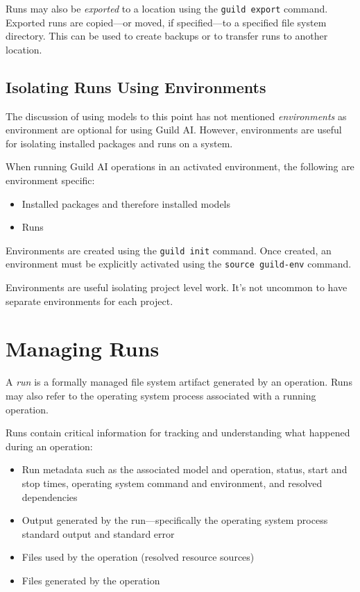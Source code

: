 \documentclass{article}
\begin{document}
Runs may also be \emph{exported} to a location using the
\verb|guild export| command. Exported runs are copied---or moved, if
specified---to a specified file system directory. This can be used to
create backups or to transfer runs to another location.

\subsection{Isolating Runs Using Environments}

The discussion of using models to this point has not mentioned
\emph{environments} as environment are optional for using Guild
AI. However, environments are useful for isolating installed packages
and runs on a system.

When running Guild AI operations in an activated environment, the
following are environment specific:

\begin{itemize}
\item Installed packages and therefore installed models
\item Runs
\end{itemize}

Environments are created using the \verb|guild init| command. Once
created, an environment must be explicitly activated using the
\verb|source guild-env| command.

Environments are useful isolating project level work. It's not uncommon
to have separate environments for each project.

\section{Managing Runs}
\label{sec:runs}

A \emph{run} is a formally managed file system artifact generated by
an operation. Runs may also refer to the operating system process
associated with a running operation.

Runs contain critical information for tracking and understanding what
happened during an operation:

\begin{itemize}
\item Run metadata such as the associated model and operation, status,
  start and stop times, operating system command and environment, and
  resolved dependencies
\item Output generated by the run---specifically the operating system
  process standard output and standard error
\item Files used by the operation (resolved resource sources)
\item Files generated by the operation
\end{itemize}
\end{document}
